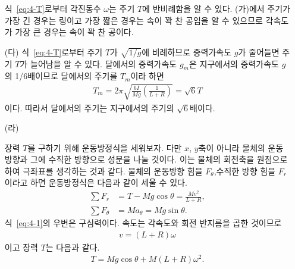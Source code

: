 \documentclass[floatfix,nofootinbib,superscriptaddress,fleqn]{revtex4-2}
\begin{document}
\begin{itemize}
  식~\eqref{eq:4-T}로부터 각진동수 $\omega$는 주기 $T$에 반비례함을 알 수 있다.
  (가)에서 주기가 가장 긴 경우는 링이고 가장 짧은 경우는 속이 꽉 찬 공임을 알 수 있으므로 
  각속도가 가장 큰 경우는 속이 꽉 찬 공이다.
  \item[(다)] 
  식~\eqref{eq:4-T}로부터 주기 $T$가 $\sqrt{1/g}$에 비례하므로
   중력가속도 $g$가 줄어들면 주기 $T$가 늘어남을 알 수 있다.
  달에서의 중력가속도 $g_m$은 지구에서의 중력가속도 $g$의 1/6배이므로 달에서의 주기를
  $T_m$이라 하면
  \begin{align}
    T_m = 2\pi\sqrt{\frac{6I}{Mg}\left(\frac{1}{L+R}\right)}=\sqrt{6}T
  \end{align}
  이다. 따라서 달에서의 주기는 지구에서의 주기의 $\sqrt{6}$배이다.
  \item[(라)] 


  \begin{figure}[htp]
    \end{figure}

    장력 $T$를 구하기 위해 운동방정식을 세워보자. 다만 $x$, $y$축이 아니라 물체의 운동방향과
    그에 수직한 방향으로 성분을 나눌 것이다. 이는 물체의 회전축을 원점으로 하여 극좌표를 생각하는 것과 같다.
    물체의 운동방향 힘을 $F_{\theta}$,수직한 방향 힘을
    $F_r$이라고 하면 운동방정식은 다음과 같이 세울 수 있다.
    \begin{align}
      \label{eq:4-1}\sum F_r &= T - Mg\cos\theta = \frac{Mv^2}{L+R} ,   \\
      \label{eq:4-2}\sum F_{\theta} &=Ma_{\theta} =  Mg\sin\theta.
    \end{align}
    식~\eqref{eq:4-1}의 우변은 구심력이다. 속도는 각속도와 회전 반지름을 곱한 것이므로
    \begin{align}
      v = (L+R)\omega
    \end{align}
    이고 장력 $T$는 다음과 같다.
    \begin{align}
      T = Mg\cos\theta + M(L+R)\omega^2.
    \end{align}
\end{itemize}
\end{document}
